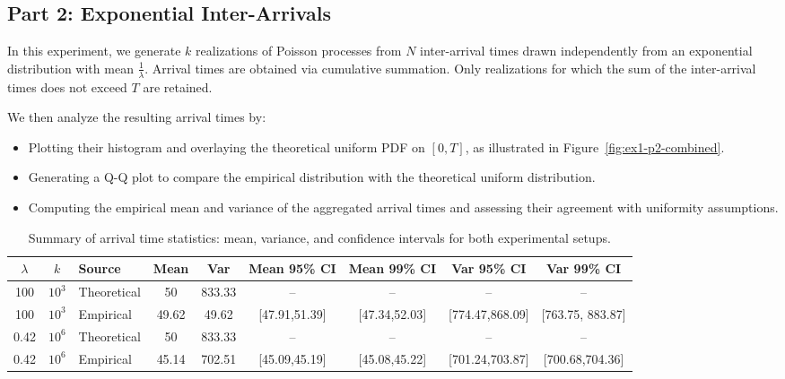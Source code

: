 \documentclass[a4paper]{article}
\begin{document}
\subsection*{Part 2: Exponential Inter-Arrivals}

In this experiment, we generate $k$ realizations of Poisson processes from $N$ inter-arrival times drawn independently from an exponential distribution with mean $\frac{1}{\lambda}$. Arrival times are obtained via cumulative summation. Only realizations for which the sum of the inter-arrival times does not exceed $T$ are retained.

\noindent
We then analyze the resulting arrival times by:

\begin{itemize}
  \setlength\itemsep{0.01em}
  \item Plotting their histogram and overlaying the theoretical uniform PDF on $[0, T]$, as illustrated in Figure~\ref{fig:ex1-p2-combined}.
  \item Generating a Q-Q plot to compare the empirical distribution with the theoretical uniform distribution.
  \item Computing the empirical mean and variance of the aggregated arrival times and assessing their agreement with uniformity assumptions.
\end{itemize}

\begin{table}[htbp]
  \centering
  \small
  \begin{tabular}{@{}cc|lcccccc@{}}
    \toprule
    $\lambda$ & $k$ & Source & Mean & Var & Mean 95\% CI & Mean 99\% CI & Var 95\% CI & Var 99\% CI \\
    \midrule
    100 & $10^3$ & Theoretical & 50 & 833.33 & -- & -- & -- & -- \\
    100 & $10^3$ & Empirical   & 49.62 & 49.62 & [47.91,51.39] & [47.34,52.03] & [774.47,868.09] & [763.75, 883.87] \\
    \midrule
    0.42 & $10^6$ & Theoretical & 50 & 833.33 & -- & -- & -- & -- \\
    0.42 & $10^6$ & Empirical   & 45.14 & 702.51 & [45.09,45.19] & [45.08,45.22] & [701.24,703.87] & [700.68,704.36] \\
    \bottomrule
  \end{tabular}
  \caption{Summary of arrival time statistics: mean, variance, and confidence intervals for both experimental setups.}\label{tab:ex1-p2-ci-summary}
\end{table}
\end{document}
